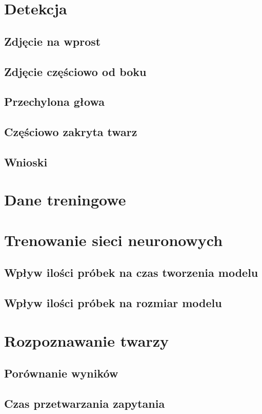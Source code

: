 \section{Detekcja}
\subsection{Zdjęcie na wprost}
\subsection{Zdjęcie częściowo od boku}
\subsection{Przechylona głowa}
\subsection{Częściowo zakryta twarz}
\subsection{Wnioski}

\section{Dane treningowe}


\section{Trenowanie sieci neuronowych}
\subsection{Wpływ ilości próbek na czas tworzenia modelu}
\subsection{Wpływ ilości próbek na rozmiar modelu}

\section{Rozpoznawanie twarzy}
\subsection{Porównanie wyników}
\subsection{Czas przetwarzania zapytania}

